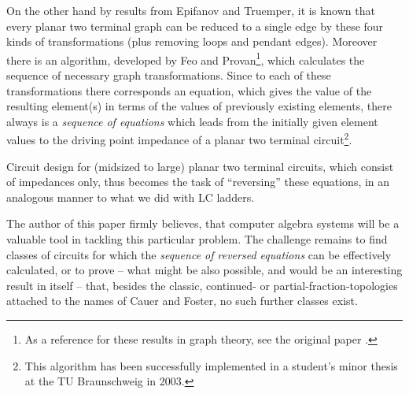 \documentclass[10pt,twocolumn,pagenumbers]{IEEEtran}
\begin{document}
On the other hand by results from Epifanov and Truemper, it is known that every planar two terminal graph can be reduced to a single edge by these four kinds of transformations (plus removing loops and pendant edges). Moreover there is an algorithm, developed by Feo and Provan\footnote{As a reference for these results in graph theory, see the original paper \cite{FeoProvan}.}, which calculates the sequence of necessary graph transformations. Since to each of these transformations there corresponds an equation, which gives the value of the resulting element(s) in terms of the values of previously existing elements, there always is a {\sl sequence of equations} which leads from the initially given element values to the driving point impedance of a planar two terminal circuit\footnote{This algorithm has been successfully implemented in a student's minor thesis \cite{DomannStudien} at the TU Braunschweig in 2003.}.

Circuit design for (midsized to large) planar two terminal circuits, which consist of impedances only, thus becomes the task of ``reversing'' these equations, in an analogous manner to what we did with LC ladders.

 The author of this paper firmly believes, that computer algebra systems will be a valuable tool in tackling this particular problem. The challenge remains to find classes of circuits for which the {\sl sequence of reversed equations} can be effectively calculated, or to prove -- what might be also possible, and would be an interesting result in itself -- that, besides the classic, continued- or partial-fraction-topologies attached to the names of Cauer and Foster, no such further classes exist.  
\end{document}
